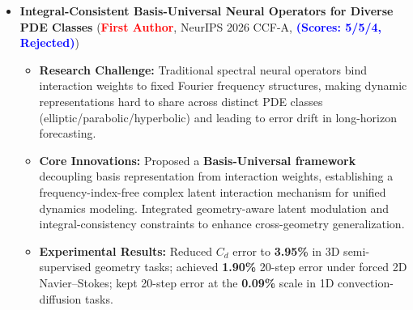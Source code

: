 \documentclass[11pt]{article}
\begin{document}
\begin{itemize}
    \item \textbf{Integral-Consistent Basis-Universal Neural Operators for Diverse PDE Classes} (\textcolor{red}{\textbf{First Author}}, NeurIPS 2026 CCF-A, \textcolor{blue}{\textbf{(Scores: 5/5/4, Rejected)}})
    \begin{itemize}[label=\tiny$\bullet$, leftmargin=1em]
        \item \textbf{Research Challenge:} Traditional spectral neural operators bind interaction weights to fixed Fourier frequency structures, making dynamic representations hard to share across distinct PDE classes (elliptic/parabolic/hyperbolic) and leading to error drift in long-horizon forecasting.
        \item \textbf{Core Innovations:} Proposed a \textbf{Basis-Universal framework} decoupling basis representation from interaction weights, establishing a frequency-index-free complex latent interaction mechanism for unified dynamics modeling. Integrated geometry-aware latent modulation and integral-consistency constraints to enhance cross-geometry generalization.
        \item \textbf{Experimental Results:} Reduced $C_d$ error to \textbf{3.95\%} in 3D semi-supervised geometry tasks; achieved \textbf{1.90\%} 20-step error under forced 2D Navier--Stokes; kept 20-step error at the \textbf{0.09\%} scale in 1D convection-diffusion tasks.
    \end{itemize}
\end{itemize}
\vspace{0.5em} %
\end{document}
